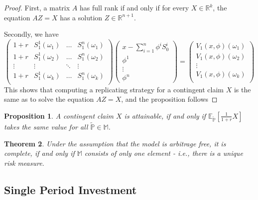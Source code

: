 \documentclass[10pt, oneside, reqno]{amsart}
\theoremstyle{plain}%
\newtheorem{thm}{Theorem}[subsection]
\newtheorem{prop}[thm]{Proposition}
\theoremstyle{definition}
\theoremstyle{remark}
\newcommand{\expp}[1]{\mathbb{E}_{\rnm}\left[#1\right]}
\newcommand{\R}{\mathbb{R}}
\newcommand{\sumni}{\sum_{i=1}^n}
\newcommand{\rnm}{\tilde{\mathbb{P}}}
\begin{document}
\begin{proof}
	First, a matrix $A$ has full rank if and only if for every $X \in \R^k$, the equation $AZ = X$ has a solution $Z \in \R^{n+1}$.  
	
	Secondly, we have \[
		 \begin{pmatrix}
	 		1 +r & S^1_1 (\omega_1) & \ldots & S^n_1(\omega_1) \\
	 		1 +r & S^1_1 (\omega_2) & \ldots & S^n_1(\omega_2) \\
			\vdots & \vdots 		& \ddots & \vdots  \\
	 		1 +r & S^1_1 (\omega_k) & \ldots & S^n_1(\omega_k) \\

	 	\end{pmatrix} 
		\begin{pmatrix}
			x - \sumni \phi^i S_0^i \\
			\phi^1 \\
			\vdots \\
			\phi^n
		\end{pmatrix}
		= 
		\begin{pmatrix}
			V_1(x,\phi)(\omega_1) \\
			V_1(x,\phi)(\omega_2) \\
			\vdots \\
			V_1(x,\phi)(\omega_k) \\
			
		\end{pmatrix}
	\]
	This shows that computing a replicating strategy for a contingent claim $X$ is the same as to solve the equation $AZ = X$, and the proposition follows
\end{proof}

\begin{prop}
	A contingent claim $X$ is attainable, if and only if $\expp{\frac{1}{1+r}X}$ takes the same value for all $\rnm \in \mathbb{M}$.
\end{prop}

\begin{thm}
	Under the assumption that the model is arbitrage free, it is complete, if and only if $\mathbb{M}$ consists of only one element - i.e., there is a unique risk measure.
\end{thm}

\subsection{Single Period Investment} %
\label{sec:single_period_investment}
\end{document}
